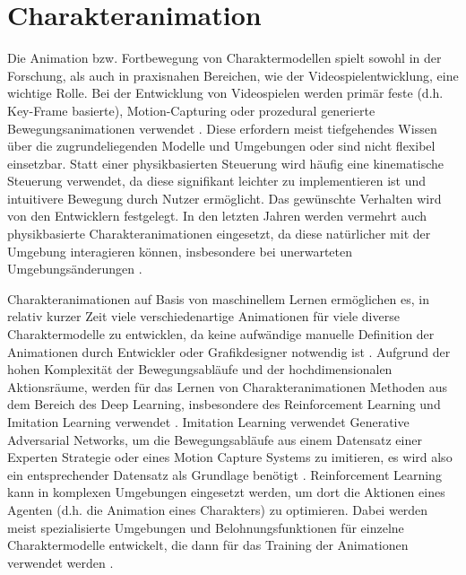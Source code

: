 \section{Charakteranimation}
Die Animation bzw. Fortbewegung von Charaktermodellen spielt sowohl in der Forschung, als auch in praxisnahen Bereichen, wie der Videospielentwicklung, eine wichtige Rolle.
Bei der Entwicklung von Videospielen werden primär feste (d.h. Key-Frame basierte), Motion-Capturing oder prozedural generierte Bewegungsanimationen verwendet \cite{procedural_character_animation}. Diese erfordern meist tiefgehendes Wissen über die zugrundeliegenden Modelle und Umgebungen oder sind nicht flexibel einsetzbar. Statt einer physikbasierten Steuerung wird häufig eine kinematische Steuerung verwendet, da diese signifikant leichter zu implementieren ist und intuitivere Bewegung durch Nutzer ermöglicht. Das gewünschte Verhalten wird von den Entwicklern festgelegt. In den letzten Jahren werden vermehrt auch physikbasierte Charakteranimationen eingesetzt, da diese natürlicher mit der Umgebung interagieren können, insbesondere bei unerwarteten Umgebungsänderungen \cite{Geijtenbeek2012}.

Charakteranimationen auf Basis von maschinellem Lernen ermöglichen es, in relativ kurzer Zeit viele verschiedenartige Animationen für viele diverse Charaktermodelle zu entwicklen, da keine aufwändige manuelle Definition der Animationen durch Entwickler oder Grafikdesigner notwendig ist \cite{reinforcement_animation}. Aufgrund der hohen Komplexität der Bewegungsabläufe und der hochdimensionalen Aktionsräume, werden für das Lernen von Charakteranimationen Methoden aus dem Bereich des Deep Learning, insbesondere des Reinforcement Learning und Imitation Learning verwendet \cite{reusable_skills, deep_learning_animation}. Imitation Learning verwendet Generative Adversarial Networks, um die Bewegungsabläufe aus einem Datensatz einer Experten Strategie oder eines Motion Capture Systems zu imitieren, es wird also ein entsprechender Datensatz als Grundlage benötigt \cite{gail,reusable_skills}. Reinforcement Learning kann in komplexen Umgebungen eingesetzt werden, um dort die Aktionen eines Agenten (d.h. die Animation eines Charakters) zu optimieren. Dabei werden meist spezialisierte Umgebungen und Belohnungsfunktionen für einzelne Charaktermodelle entwickelt, die dann für das Training der Animationen verwendet werden \cite{deep_learning_animation}. 

